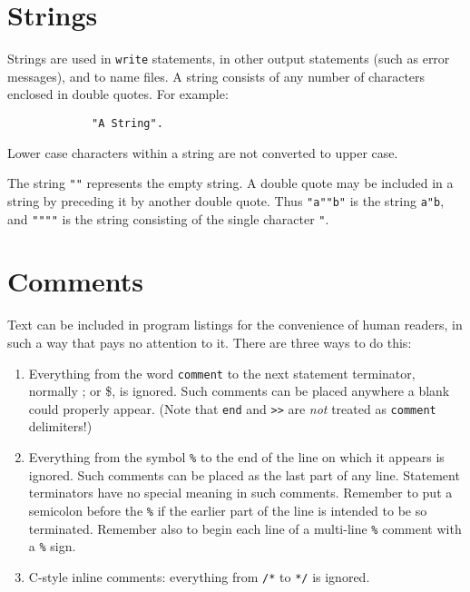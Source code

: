\section{Strings}

Strings are used in \texttt{write} statements, in other
output statements (such as error messages), and to name files.  A string
consists of any number of characters enclosed in double quotes.  For example:
\begin{verbatim}
             "A String".
\end{verbatim}
Lower case characters within a string are not converted to upper case.

The string \texttt{""} represents the empty string.  A double quote may be
included in a string by preceding it by another double quote.  Thus
\texttt{"a""b"} is the string \texttt{a"b}, and \texttt{""""} is the string
consisting of the single character \texttt{"}.

\hypertarget{comments}{\section{Comments}}

Text can be included in program listings for the
convenience of human readers, in such a way that {\REDUCE} pays no
attention to it.  There are three ways to do this:

\begin{enumerate}
\item Everything from the word \texttt{comment}
  to the next
statement terminator, normally ; or \$, is ignored.  Such comments
can be placed anywhere a blank could properly appear. (Note that \texttt{end}
and \texttt{>}\texttt{>} are \emph{not} treated as \texttt{comment} delimiters!)

\item Everything from the symbol \texttt{\%}
  to the end
of the line on which it appears is ignored.  Such comments can be placed
as the last part of any line.  Statement terminators have no special
meaning in such comments.  Remember to put a semicolon before the \texttt{\%}
if the earlier part of the line is intended to be so terminated.  Remember
also to begin each line of a multi-line \texttt{\%} comment with a \texttt{\%}
sign.

\item C-style inline comments: everything from \texttt{/*} to \texttt{*/}
  is ignored.
\end{enumerate}

